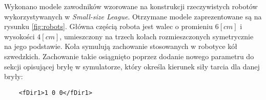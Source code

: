 	Wykonano modele zawodników wzorowane na konstrukcji rzeczywistych robotów wykorzystywanych w \emph{Small-size League}. Otrzymane modele zaprezentowane są na rysunku \ref{fig:robots}.
	Główna częścią robota jest walec o promieniu $6[cm]$ i wysokości $4[cm]$, umieszczony na trzech kołach rozmieszczonych symetrycznie na jego podstawie.
	Koła symulują zachowanie stosowanych w robotyce kół szwedzkich. Zachowanie takie osiągnięto poprzez dodanie nowego parametru do sekcji opisującej bryłę w symulatorze,
	który określa kierunek siły tarcia dla danej bryły:
	\begin{lstlisting}	
	<fDir1>1 0 0</fDir1>
	\end{lstlisting}
	
